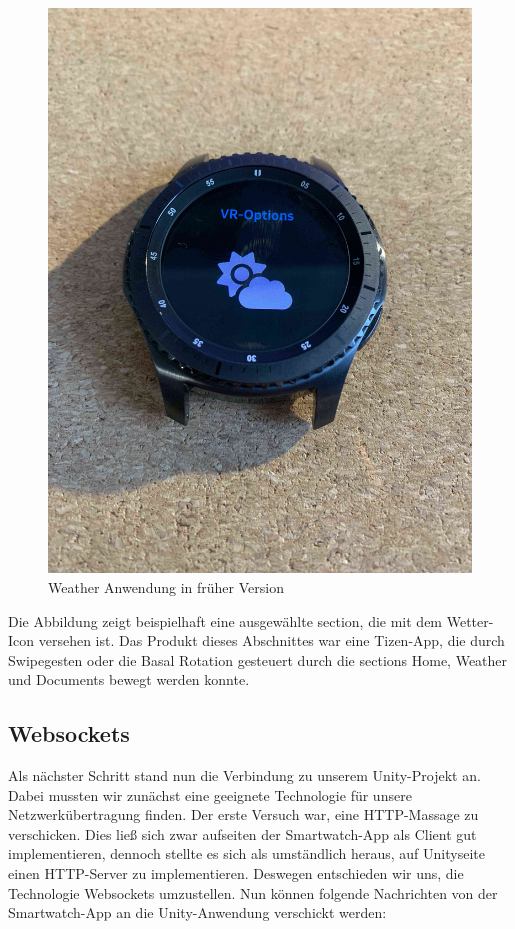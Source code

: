 \documentclass[11pt, a4paper]{article}
\begin{document}
\begin{figure}[h]
	\centering
	\includegraphics[scale=.25]{assets/smartwatch_app_erstversion.jpg}
	\caption{Weather Anwendung in früher Version}
	\label{fig:app_erstversion}
\end{figure}

Die Abbildung zeigt beispielhaft eine ausgewählte section, die mit dem Wetter-Icon versehen ist. Das Produkt dieses Abschnittes war eine Tizen-App, die durch Swipegesten oder die Basal Rotation gesteuert durch die sections Home, Weather und Documents bewegt werden konnte. 

\subsection{Websockets}

Als nächster Schritt stand nun die Verbindung zu unserem Unity-Projekt an. Dabei mussten wir zunächst eine geeignete Technologie für unsere Netzwerkübertragung finden. Der erste Versuch war, eine HTTP-Massage zu verschicken. Dies ließ sich zwar aufseiten der Smartwatch-App als Client gut implementieren, dennoch stellte es sich als umständlich heraus, auf Unityseite einen HTTP-Server zu implementieren. Deswegen entschieden wir uns, die Technologie Websockets umzustellen. Nun können folgende Nachrichten von der Smartwatch-App an die Unity-Anwendung verschickt werden: 
\end{document}
